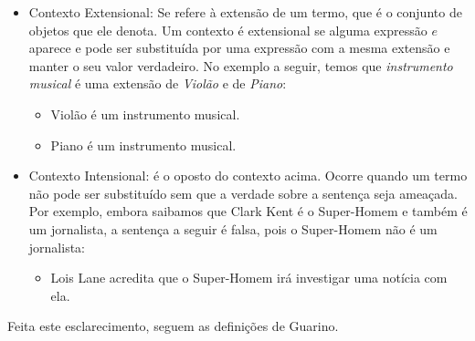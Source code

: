 \begin{itemize}
	\item Contexto Extensional: Se refere à extensão de um termo, que é o conjunto de objetos que ele denota. Um contexto é extensional se alguma expressão $ e $ aparece e pode ser substituída por uma expressão com a mesma extensão e manter o seu valor verdadeiro. No exemplo a seguir, temos que \textit{instrumento musical} é uma extensão de \textit{Violão} e de \textit{Piano}: 
	\begin{itemize}
		\item Violão é um instrumento musical.
		\item Piano é um instrumento musical.
	\end{itemize}
	
	\item Contexto Intensional: é o oposto do contexto acima. Ocorre quando um termo não pode ser substituído sem que a verdade sobre a sentença seja ameaçada. Por exemplo, embora saibamos que Clark Kent é o Super-Homem e também é um jornalista, a sentença a seguir é falsa, pois o Super-Homem não é um jornalista:
	\begin{itemize}
		\item Lois Lane acredita que o Super-Homem irá investigar uma notícia com ela. 
	\end{itemize}
	
\end{itemize}

Feita este esclarecimento, seguem as definições de Guarino.

